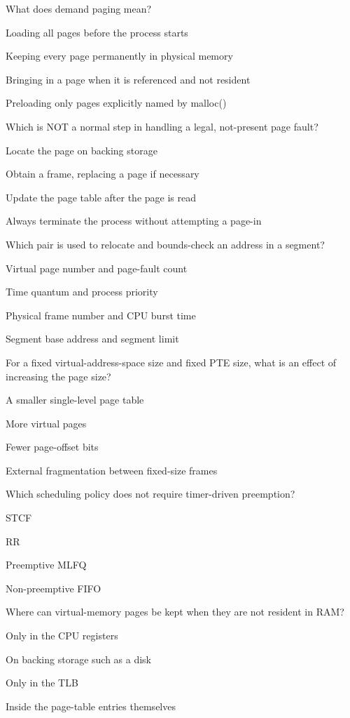 \begin{questions}\setlength{\itemsep}{0.12cm}\setcounter{question}{24}
\question What does demand paging mean?
\begin{verticalchoices}
\item Loading all pages before the process starts
\item Keeping every page permanently in physical memory
\item Bringing in a page when it is referenced and not resident
\item Preloading only pages explicitly named by malloc()
\end{verticalchoices}
\question Which is NOT a normal step in handling a legal, not-present page fault?
\begin{verticalchoices}
\item Locate the page on backing storage
\item Obtain a frame, replacing a page if necessary
\item Update the page table after the page is read
\item Always terminate the process without attempting a page-in
\end{verticalchoices}
\question Which pair is used to relocate and bounds-check an address in a segment?
\begin{verticalchoices}
\item Virtual page number and page-fault count
\item Time quantum and process priority
\item Physical frame number and CPU burst time
\item Segment base address and segment limit
\end{verticalchoices}
\question For a fixed virtual-address-space size and fixed PTE size, what is an effect of increasing the page size?
\begin{verticalchoices}
\item A smaller single-level page table
\item More virtual pages
\item Fewer page-offset bits
\item External fragmentation between fixed-size frames
\end{verticalchoices}
\question Which scheduling policy does not require timer-driven preemption?
\begin{verticalchoices}
\item STCF
\item RR
\item Preemptive MLFQ
\item Non-preemptive FIFO
\end{verticalchoices}
\question Where can virtual-memory pages be kept when they are not resident in RAM?
\begin{verticalchoices}
\item Only in the CPU registers
\item On backing storage such as a disk
\item Only in the TLB
\item Inside the page-table entries themselves
\end{verticalchoices}
\end{questions}\vfill\newpage
